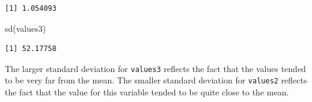 \documentclass[
  letterpaper,
  DIV=11,
  numbers=noendperiod]{scrartcl}
\newenvironment{Shaded}{\begin{snugshade}}{\end{snugshade}}
\newcommand{\FunctionTok}[1]{\textcolor[rgb]{0.28,0.35,0.67}{#1}}
\newcommand{\NormalTok}[1]{\textcolor[rgb]{0.00,0.23,0.31}{#1}}
\begin{document}
\begin{verbatim}
[1] 1.054093
\end{verbatim}

\begin{Shaded}
\begin{Highlighting}[]
\FunctionTok{sd}\NormalTok{(values3)}
\end{Highlighting}
\end{Shaded}

\begin{verbatim}
[1] 52.17758
\end{verbatim}

The larger standard deviation for \texttt{values3} reflects the fact
that the values tended to be very far from the mean. The smaller
standard deviation for \texttt{values2} reflects the fact that the value
for this variable tended to be quite close to the mean.
\end{document}

